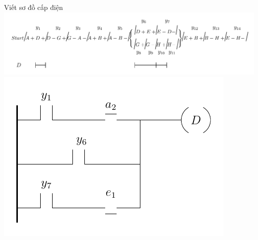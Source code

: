 \documentclass[24pt]{beamer}
\begin{document}
\begin{frame}[plain]{Viết sơ đồ cấp điện}
		\vspace{-0.5cm}
		\hspace{-1cm}\includegraphics[scale=0.7]{draw-tikz/quatrinh-bt4-buoc3-sodocapdien-D-b1.pdf}\\
		\vspace{-.7cm}
		\includegraphics[scale=1.1]{draw-tikz/quatrinh-bt4-buoc3-sodocapdien-D-b2.pdf}
\end{frame}
\end{document}
